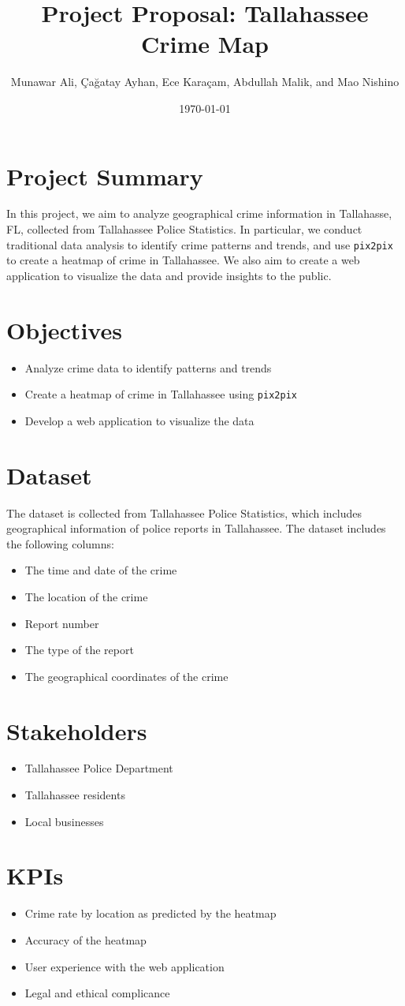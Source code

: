 \documentclass[10pt]{article}
\title{Project Proposal: Tallahassee Crime Map}
\author{Munawar Ali, Çağatay Ayhan, Ece Karaçam, Abdullah Malik, and Mao Nishino}
\date{\today}
\begin{document}
\maketitle

\section{Project Summary}
In this project, we aim to analyze geographical crime information in Tallahasse, FL, collected from Tallahassee Police Statistics. In particular, we conduct traditional data analysis to identify crime patterns and trends, and use \verb|pix2pix| to create a heatmap of crime in Tallahassee. We also aim to create a web application to visualize the data and provide insights to the public.

\section{Objectives}
\begin{itemize}
    \item Analyze crime data to identify patterns and trends
    \item Create a heatmap of crime in Tallahassee using \verb|pix2pix|
    \item Develop a web application to visualize the data
\end{itemize}

\section{Dataset}
The dataset is collected from Tallahassee Police Statistics, which includes geographical information of police reports in Tallahassee. The dataset includes the following columns:
\begin{itemize}
    \item The time and date of the crime
    \item The location of the crime
    \item Report number
    \item The type of the report
    \item The geographical coordinates of the crime
\end{itemize}

\section{Stakeholders}
\begin{itemize}
    \item Tallahassee Police Department
    \item Tallahassee residents
    \item Local businesses
\end{itemize}


\section{KPIs}
\begin{itemize}
    \item Crime rate by location as predicted by the heatmap
    \item Accuracy of the heatmap
    \item User experience with the web application
    \item Legal and ethical complicance
\end{itemize}
\end{document}

